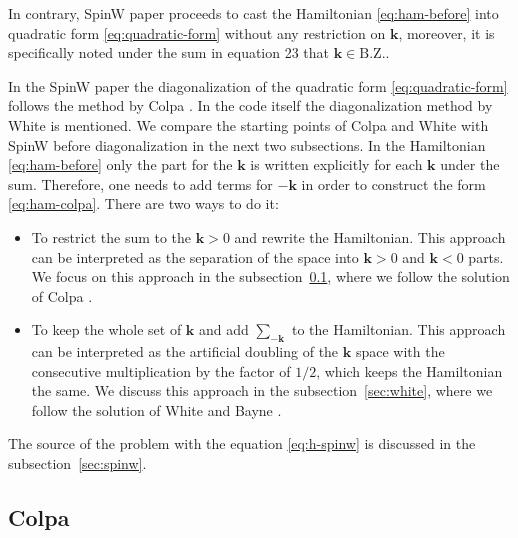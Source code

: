 \documentclass[a4paper,12pt]{article}
\begin{document}
        In contrary, SpinW paper \cite{toth2015linear} proceeds to cast the Hamiltonian \eqref{eq:ham-before} into quadratic form \eqref{eq:quadratic-form} without any restriction on $\boldsymbol{k}$,
        moreover, it is specifically noted under the sum in equation 23 that $\boldsymbol{k} \in \text{B.Z.}$.

        In the SpinW paper the diagonalization of the quadratic form \eqref{eq:quadratic-form} follows the method by Colpa \cite{colpa1978diagonalization}. 
        In the code itself the diagonalization method by White \cite{white1965diagonalization} is mentioned.
        We compare the starting points of Colpa and White with SpinW before diagonalization in the next two subsections. 
        In the Hamiltonian \eqref{eq:ham-before} only the part for the $\boldsymbol{k}$ is written explicitly for each $\boldsymbol{k}$ under the sum. 
        Therefore, one needs to add terms for $-\boldsymbol{k}$ in order to construct the form \eqref{eq:ham-colpa}. 
        There are two ways to do it:

        \begin{itemize}
            \item To restrict the sum to the $\boldsymbol{k} > 0$ and rewrite the Hamiltonian. 
            This approach can be interpreted as the separation of the space into $\boldsymbol{k} > 0$ and $\boldsymbol{k} < 0$ parts. 
            We focus on this approach in the subsection~\ref{sec:colpa}, where we follow the solution of Colpa \cite{colpa1978diagonalization}.

            \item To keep the whole set of $\boldsymbol{k}$ and add $\sum_{-\boldsymbol{k}}$ to the Hamiltonian.
            This approach can be interpreted as the artificial doubling of the $\boldsymbol{k}$ space 
            with the consecutive multiplication by the factor of $1/2$, which keeps the Hamiltonian the same. 
            We discuss this approach in the subsection~\ref{sec:white}, where we follow the solution of White and Bayne \cite{white1983quantum}.
        \end{itemize}

        The source of the problem with the equation \eqref{eq:h-spinw} is discussed in the subsection~\ref{sec:spinw}. 
        
        \subsection{Colpa \cite{colpa1978diagonalization}}\label{sec:colpa}
        
\end{document}
